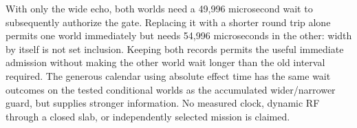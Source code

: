 \documentclass{article}
\begin{document}
With only the wide echo, both worlds need a 49,996 microsecond wait to
subsequently authorize the gate. Replacing it with a shorter round trip
alone permits one world immediately but needs 54,996 microseconds
in the other: width by itself is not set inclusion. Keeping both
records permits the useful immediate admission without making the
other world wait longer than the old interval required. The generous
calendar using absolute effect time has the same wait outcomes on the
tested conditional worlds as the accumulated wider/narrower guard,
but supplies stronger information. No measured clock, dynamic RF
through a closed slab, or independently selected mission is claimed.
\end{document}
